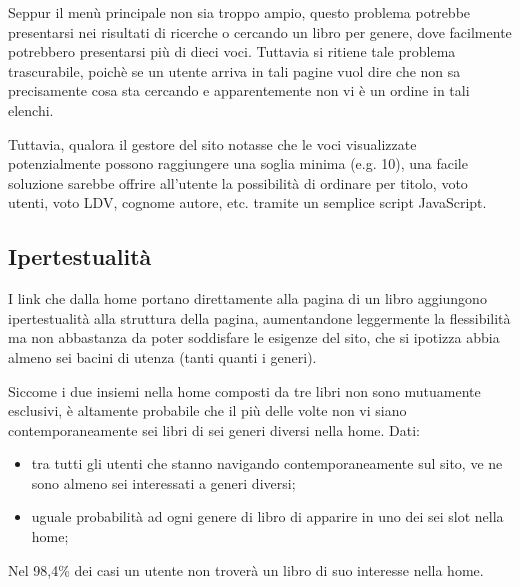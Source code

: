 Seppur il menù principale non sia troppo ampio, questo problema potrebbe
presentarsi nei risultati di ricerche o cercando un libro per genere, dove
facilmente potrebbero presentarsi più di dieci voci.
Tuttavia si ritiene tale problema trascurabile, poichè se un utente arriva in
tali pagine vuol dire che non sa precisamente cosa sta cercando e
apparentemente non vi è un ordine in tali elenchi.

Tuttavia, qualora il gestore del sito notasse che le voci visualizzate
potenzialmente possono raggiungere una soglia minima (e.g. 10), una facile
soluzione sarebbe offrire all'utente la possibilità di ordinare per titolo,
voto utenti, voto LDV, cognome autore, etc. tramite un semplice script
JavaScript.

\subsection{Ipertestualità}
I link che dalla home portano direttamente alla pagina di un libro aggiungono
ipertestualità alla struttura della pagina, aumentandone leggermente la
flessibilità ma non abbastanza da poter soddisfare le esigenze del sito, che
si ipotizza abbia almeno sei bacini di utenza (tanti quanti i generi).

Siccome i due insiemi nella home composti da tre libri non sono mutuamente
esclusivi, è altamente probabile che il più delle volte non vi siano
contemporaneamente sei libri di sei generi diversi nella home.
Dati:
\begin{itemize}
\item tra tutti gli utenti che stanno navigando contemporaneamente sul sito,
ve ne sono almeno sei interessati a generi diversi;
\item uguale probabilità ad ogni genere di libro di apparire in uno dei sei slot nella home;
\end{itemize}
Nel 98,4\% dei casi un utente non troverà un libro di suo interesse nella home.
